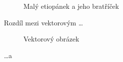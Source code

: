 \documentclass[a4paper,11pt]{article}
\begin{document}
\begin{figure}[h]
\centering
{}
\caption{Malý etiopánek a jeho bratříček}
\label{etiopan}
\end{figure}   

\newpage

Rozdíl mezi vektorovým \dots

\begin{figure}[h]
\centering
{}
\caption{Vektorový obrázek}
\label{oniisan}
\end{figure}
\bigskip

\noindent \dots a
\end{document}
